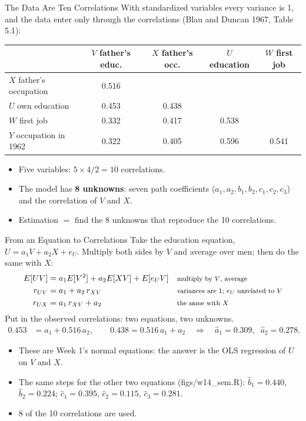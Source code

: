 \documentclass[aspectratio=169,11pt,xcolor=dvipsnames]{beamer}
\newcommand{\srcp}[1]{{\scriptsize\color{gray}(#1)}}
\begin{document}
\begin{frame}{The Data Are Ten Correlations}
With standardized variables every variance is 1, and the data enter only through the correlations
\srcp{Blau and Duncan 1967, Table 5.1}:
\begin{center}\small
\renewcommand{\arraystretch}{1.1}
\begin{tabular}{@{}lcccc@{}}
\toprule
 & $V$ father's educ. & $X$ father's occ. & $U$ education & $W$ first job \\
\midrule
$X$ father's occupation & 0.516 \\
$U$ own education & 0.453 & 0.438 \\
$W$ first job & 0.332 & 0.417 & 0.538 \\
$Y$ occupation in 1962 & 0.322 & 0.405 & 0.596 & 0.541 \\
\bottomrule
\end{tabular}
\end{center}
\begin{itemize}\itemsep4pt
  \item Five variables: $5 \times 4 / 2 = 10$ correlations.
  \item The model has \textbf{8 unknowns}: seven path coefficients
        ($a_1, a_2, b_1, b_2, c_1, c_2, c_3$) and the correlation of $V$ and $X$.
  \item Estimation $=$ find the 8 unknowns that reproduce the 10 correlations.
\end{itemize}
\end{frame}

\begin{frame}{From an Equation to Correlations}
Take the education equation, $U = a_1 V + a_2 X + e_U$. Multiply both sides by $V$ and average
over men; then do the same with $X$:
\begin{align*}
  E[U V] &= a_1 E[V^2] + a_2 E[X V] + E[e_U V]
    && \text{\footnotesize multiply by $V$, average} \\
  r_{UV} &= a_1 + a_2\, r_{XV}
    && \text{\footnotesize variances are 1; $e_U$ unrelated to $V$} \\
  r_{UX} &= a_1\, r_{XV} + a_2
    && \text{\footnotesize the same with $X$}
\end{align*}
\vskip-4pt
Put in the observed correlations: two equations, two unknowns.
\begin{align*}
  0.453 &= a_1 + 0.516\, a_2, \qquad 0.438 = 0.516\, a_1 + a_2
  \quad\Longrightarrow\quad \hat a_1 = 0.309, \;\; \hat a_2 = 0.278 .
\end{align*}
\begin{itemize}\itemsep3pt
  \item These are Week 1's normal equations: the answer is the OLS regression of $U$ on $V$ and $X$.
  \item The same steps for the other two equations \srcp{figs/w14\_sem.R}:
        $\hat b_1 = 0.440$, $\hat b_2 = 0.224$; $\hat c_1 = 0.395$, $\hat c_2 = 0.115$,
        $\hat c_3 = 0.281$.
  \item 8 of the 10 correlations are used.
\end{itemize}
\vskip-2pt
\end{frame}
\end{document}
